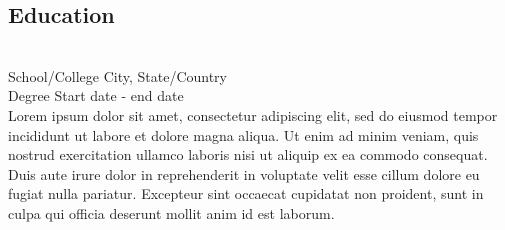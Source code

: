 \documentclass{resume_template}
\begin{document}
\begin{tcbraster}[raster columns=6,raster height=11in,raster column skip=0in,raster row skip=0in,raster force size=false]
\begin{tcolorbox}[colframe=white,colback=white,arc=0mm,add to width=1.25in,height=8.75in,raster multicolumn=4]
		\section*{Education}
			\vspace*{-0.2in}
			\hrulefill\\
			
			School/College \hfill City, State/Country \\
			Degree \hfill Start date - end date \\
			Lorem ipsum dolor sit amet, consectetur adipiscing elit, sed do eiusmod tempor incididunt ut labore et dolore magna aliqua. Ut enim ad minim veniam, quis nostrud exercitation ullamco laboris nisi ut aliquip ex ea commodo consequat. Duis aute irure dolor in reprehenderit in voluptate velit esse cillum dolore eu fugiat nulla pariatur. Excepteur sint occaecat cupidatat non proident, sunt in culpa qui officia deserunt mollit anim id est laborum.\\
			
	\end{tcolorbox}
\end{tcbraster}
\end{document}
